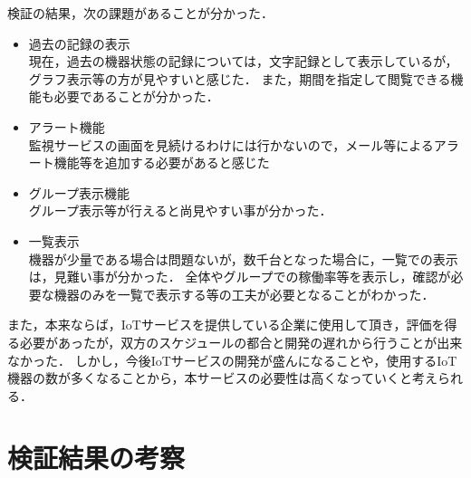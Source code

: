 
検証の結果，次の課題があることが分かった．
\begin{itemize}
\item 過去の記録の表示\\
	現在，過去の機器状態の記録については，文字記録として表示しているが，グラフ表示等の方が見やすいと感じた．
	また，期間を指定して閲覧できる機能も必要であることが分かった．
\item アラート機能\\
	監視サービスの画面を見続けるわけには行かないので，メール等によるアラート機能等を追加する必要があると感じた
\item グループ表示機能\\
	グループ表示等が行えると尚見やすい事が分かった．
\item 一覧表示\\
	機器が少量である場合は問題ないが，数千台となった場合に，一覧での表示は，見難い事が分かった．
	全体やグループでの稼働率等を表示し，確認が必要な機器のみを一覧で表示する等の工夫が必要となることがわかった．
\end{itemize}
また，本来ならば，IoTサービスを提供している企業に使用して頂き，評価を得る必要があったが，双方のスケジュールの都合と開発の遅れから行うことが出来なかった．
しかし，今後IoTサービスの開発が盛んになることや，使用するIoT機器の数が多くなることから，本サービスの必要性は高くなっていくと考えられる．

\section{検証結果の考察}



